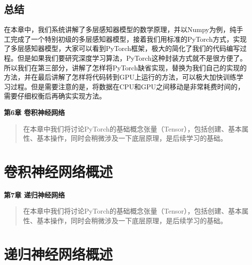 \documentclass[UTF8]{article}
\begin{document}
\subsection{总结}
在本章中，我们系统讲解了多层感知器模型的数学原理，并以Numpy为例，纯手工完成了一个特别初级的多层感知器模型，接着我们用标准的PyTorch方式，实现了多层感知器模型，大家可以看到PyTorch框架，极大的简化了我们的代码编写过程。但是如果我们要研究深度学习算法，PyTorch这种封装方式就不是很方便了。所以我们在第三部分，讲解了怎样将PyTorch缺省实现，替换为我们自己的实现的方法，并在最后讲解了怎样将代码转到GPU上运行的方法，可以极大加快训练学习过程。但是需要注意的是，将数据在CPU和GPU之间移动是非常耗费时间的，需要仔细权衡后再确实实现方法。




\newpage
\maketitle
\begin{center}
\Large \textbf{第6章 卷积神经网络} \quad \textbf{}
\end{center}
\begin{abstract}
在本章中我们将讨论PyTorch的基础概念张量（Tensor），包括创建、基本属性、基本操作，同时会稍微涉及一下底层原理，是后续学习的基础。
\end{abstract}
\section{卷积神经网络概述}

\newpage
\maketitle
\begin{center}
\Large \textbf{第7章 递归神经网络} \quad \textbf{}
\end{center}
\begin{abstract}
在本章中我们将讨论PyTorch的基础概念张量（Tensor），包括创建、基本属性、基本操作，同时会稍微涉及一下底层原理，是后续学习的基础。
\end{abstract}
\section{递归神经网络概述}



\newpage




\appendix
\end{document}
